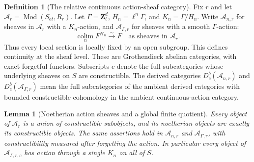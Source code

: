 \documentclass[11pt]{article}
\newtheorem{lemma}[theorem]{Lemma}
\theoremstyle{definition}
\newtheorem{definition}[theorem]{Definition}
\theoremstyle{remark}
\begin{document}
\begin{definition}[The relative continuous action-sheaf category]
\label{def:frag-relative-action-sheaves}
Fix $r$ and let $\mathcal A_r=\operatorname{Mod}(S_{\acute et},R_r)$.
Let $\Gamma=\mathbf Z_\ell^d$, $H_n=\ell^n\Gamma$, and $K_n=\Gamma/H_n$.
Write $\mathcal A_{n,r}$ for sheaves in $\mathcal A_r$ with a $K_n$-action,
and $\mathcal A_{\Gamma,r}$ for sheaves with a smooth $\Gamma$-action:
\[
\operatorname*{colim}_n F^{H_n}\xrightarrow{\sim}F
\quad\text{as sheaves in }\mathcal A_r.
\]
Thus every local section is locally fixed by an open subgroup.
This defines continuity at the sheaf level.  These are Grothendieck abelian categories, with
exact forgetful functors.  Subscripts $c$ denote the full subcategories
whose underlying sheaves on $S$ are constructible.  The derived categories
$D_c^b(\mathcal A_{n,r})$ and $D_c^b(\mathcal A_{\Gamma,r})$ mean the full
subcategories of the ambient derived categories with bounded constructible
cohomology in the ambient continuous-action category.
\end{definition}

\begin{lemma}[Noetherian action sheaves and a global finite quotient]
\label{lem:frag-noetherian-action-sheaves}
Every object of $\mathcal A_r$ is a union of constructible subobjects,
and its noetherian objects are exactly its constructible objects.
The same assertions hold in $\mathcal A_{n,r}$ and
$\mathcal A_{\Gamma,r}$, with constructibility measured after forgetting
the action.  In particular every object of
$\mathcal A_{\Gamma,r,c}$ has action through a single $K_n$ on all of $S$.
\end{lemma}
\end{document}
